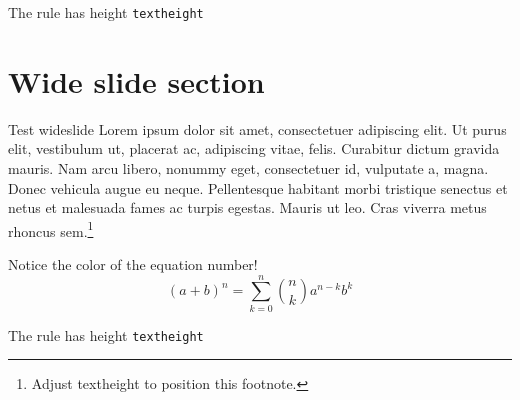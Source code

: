 \documentclass[
  style=your style,
  paper=screen,
  orient=landscape,
  size=11pt,
  clock
]{powerdot}
\makeatletter
\def\textheightrule{%
  \raisebox\baselineskip{\rule{1cm}\pd@@textheight}%
}
\makeatother
\begin{document}
\begin{slide}{The rule has height \texttt{textheight}}
  \textheightrule
\end{slide}

\section[template=wideslide]{Wide slide section}

\begin{wideslide}{Test wideslide}
  Lorem ipsum dolor sit amet, consectetuer adipiscing elit. Ut purus
  elit, vestibulum ut, placerat ac, adipiscing vitae, felis. Curabitur
  dictum gravida mauris. Nam arcu libero, nonummy eget, consectetuer
  id, vulputate a, magna. Donec vehicula augue eu neque. Pellentesque
  habitant morbi tristique senectus et netus et malesuada fames ac
  turpis egestas. Mauris ut leo. Cras viverra metus rhoncus
  sem.\footnote{Adjust textheight to position this footnote.}

  Notice the color of the equation number!
  \begin{equation}
    (a+b)^n=\sum_{k=0}^n{n\choose k}a^{n-k}b^k
  \end{equation}
\end{wideslide}

\begin{wideslide}{The rule has height \texttt{textheight}}
  \textheightrule
\end{wideslide}
\end{document}
